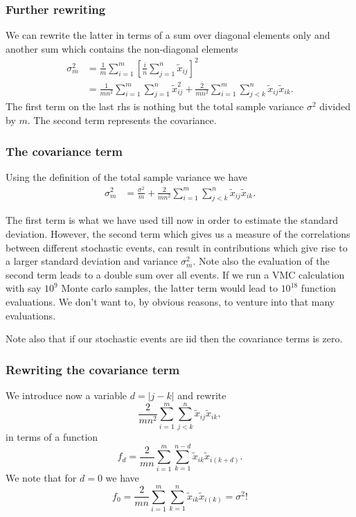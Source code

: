 \documentclass{beamer}
\begin{document}
\begin{frame}
\frametitle{Further rewriting}

We can rewrite the latter in terms of a sum over diagonal elements only and another sum which contains the non-diagonal elements
\begin{align*}
\sigma^2_{m}& =\frac{1}{m}\sum_{i=1}^{m}\left[ \frac{i}{n}\sum_{j=1}^{n}\tilde{x}_{ij}\right]^2 \\
            & = \frac{1}{mn^2}\sum_{i=1}^{m} \sum_{j=1}^{n}\tilde{x}_{ij}^2+\frac{2}{mn^2}\sum_{i=1}^{m} \sum_{j<k}^{n}\tilde{x}_{ij}\tilde{x}_{ik}.
\end{align*}
The first term on the last rhs is nothing but the total sample variance $\sigma^2$ divided by $m$. The second term represents the covariance.
\end{frame}

\begin{frame}
\frametitle{The covariance term}

Using the definition of the total sample variance we have
\begin{align*}
\sigma^2_{m}& = \frac{\sigma^2}{m}+\frac{2}{mn^2}\sum_{i=1}^{m} \sum_{j<k}^{n}\tilde{x}_{ij}\tilde{x}_{ik}.
\end{align*}

The first term is what we have used till now in order to estimate the
standard deviation. However, the second term which gives us a measure
of the correlations between different stochastic events, can result in
contributions which give rise to a larger standard deviation and
variance $\sigma_m^2$. Note also the evaluation of the second term
leads to a double sum over all events. If we run a VMC calculation
with say $10^9$ Monte carlo samples, the latter term would lead to
$10^{18}$ function evaluations. We don't want to, by obvious reasons, to venture into that many evaluations.

Note also that if our stochastic events are iid then the covariance terms is zero.
\end{frame}

\begin{frame}
\frametitle{Rewriting the covariance term}

We introduce now a variable $d=\vert j-k\vert $ and rewrite 
\[
\frac{2}{mn^2}\sum_{i=1}^{m} \sum_{j<k}^{n}\tilde{x}_{ij}\tilde{x}_{ik},
\]
in terms of a function
\[
f_d=\frac{2}{mn}\sum_{i=1}^{m} \sum_{k=1}^{n-d}\tilde{x}_{ik}\tilde{x}_{i(k+d)}.
\]
We note that for $d=0$ we have
\[
f_0=\frac{2}{mn}\sum_{i=1}^{m} \sum_{k=1}^{n}\tilde{x}_{ik}\tilde{x}_{i(k)}=\sigma^2!
\]
\end{frame}
\end{document}
